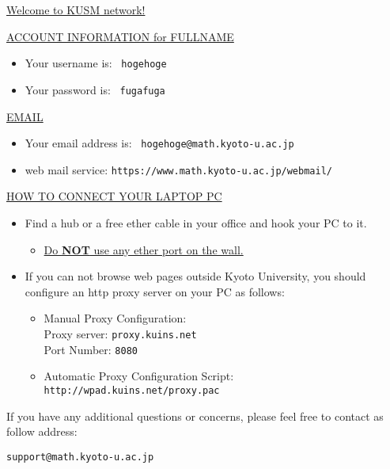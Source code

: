 \documentclass[12pt]{article}
\begin{document}
\begin{center}
\Huge
\underline{\textsf{Welcome to KUSM network!}}
\end{center}

\bigskip
\noindent
\underline{\textsf{ACCOUNT INFORMATION for FULLNAME}}
\begin{itemize}
\item Your username is: \ {\texttt{hogehoge}}
\item Your password is: \ {\texttt{fugafuga}}
\end{itemize}

\bigskip

\noindent
\underline{\textsf{EMAIL}}
\begin{itemize}
\item Your email address is: \ {\texttt{hogehoge@math.kyoto-u.ac.jp}}
\item web mail service: {\texttt{https://www.math.kyoto-u.ac.jp/webmail/}}
\end{itemize}



\bigskip
\noindent
\underline{\textsf{HOW TO CONNECT YOUR LAPTOP PC}}
\begin{itemize}
\item Find a hub or a free ether cable in your office and hook your PC to it.
  \begin{itemize}
  \item \underline{Do \textbf{NOT} use any ether port on the wall.}
  \end{itemize}
\item If you can not browse web pages outside Kyoto University,
  you should configure an http proxy server on your PC as follows:
  \begin{itemize}
  \item Manual Proxy Configuration:\\
    Proxy server: {\texttt{proxy.kuins.net}}\\
    Port Number: {\texttt{8080}}
  \item Automatic Proxy Configuration Script: \\
    {\texttt{http://wpad.kuins.net/proxy.pac}}
  \end{itemize}
\end{itemize}

If you have any additional questions or concerns, please feel free to contact as follow address:
\begin{center}
  \texttt{support@math.kyoto-u.ac.jp}
\end{center}
\end{document}
